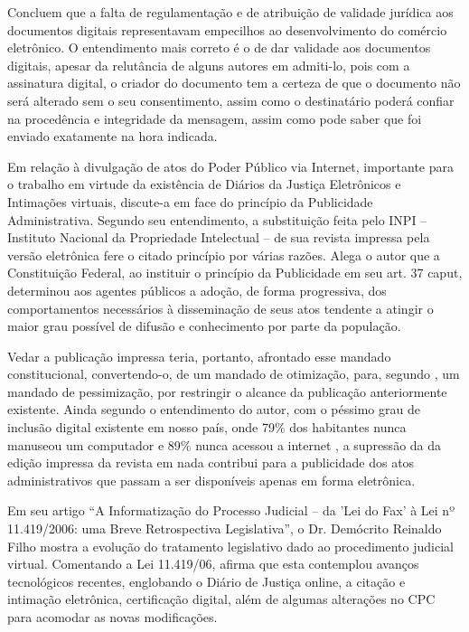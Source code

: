 	Concluem  que a falta de regulamentação e de
  atribuição de validade jurídica aos documentos digitais
  representavam empecilhos ao desenvolvimento do comércio
  eletrônico. O entendimento mais correto é o de dar validade aos
  documentos digitais, apesar da relutância de alguns autores em
  admiti-lo, pois com a assinatura digital, o criador do
  documento tem a certeza de que o documento não será alterado
  sem o seu consentimento, assim como o destinatário poderá
  confiar na procedência e integridade da mensagem, assim como
  pode saber que foi enviado exatamente na hora indicada. \par

	
	Em relação à divulgação de atos do Poder Público via Internet,
  importante para o trabalho em virtude da existência de Diários
  da Justiça Eletrônicos e Intimações virtuais,
   discute-a em face do princípio da
  Publicidade Administrativa.  Segundo seu entendimento, a
  substituição feita pelo INPI – Instituto Nacional da
  Propriedade Intelectual – de sua revista impressa pela versão
  eletrônica fere o citado princípio por várias razões. Alega o
  autor que a Constituição Federal, ao instituir o princípio da
  Publicidade em seu art. 37 caput, determinou aos agentes
  públicos a adoção, de forma progressiva, dos comportamentos
  necessários à disseminação de seus atos tendente a atingir o
  maior grau possível de difusão e conhecimento por parte da
  população. \par
	
	Vedar a publicação impressa teria, portanto, afrontado esse
  mandado constitucional, convertendo-o, de um mandado de
  otimização, para, segundo , um mandado de pessimização, por restringir o alcance da
  publicação anteriormente existente.  Ainda segundo o entendimento do autor,
  com o péssimo grau de inclusão digital existente em nosso país,
  onde 79\% dos habitantes nunca manuseou um computador e 89\%
  nunca acessou a internet
  , a supressão da da edição impressa da
  revista em nada contribui para a publicidade dos atos
  administrativos que passam a ser disponíveis apenas em forma
  eletrônica. \par
	
	
	Em seu artigo “A Informatização do Processo Judicial – da 'Lei
  do Fax' à Lei nº 11.419/2006: uma Breve Retrospectiva
      Legislativa”, o Dr. Demócrito Reinaldo Filho mostra a
      evolução do tratamento legislativo dado ao procedimento
      judicial virtual. Comentando a Lei 11.419/06, afirma que
      esta contemplou avanços tecnológicos recentes, englobando o
      Diário de Justiça online, a citação e intimação eletrônica,
      certificação digital, além de algumas alterações no CPC
      para acomodar as novas modificações.\par
	
